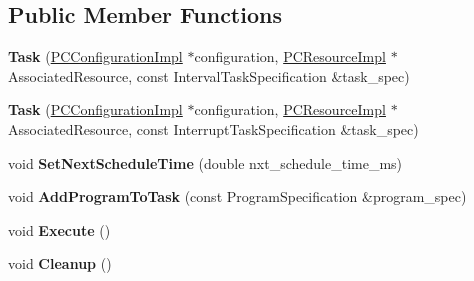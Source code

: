 \subsection*{Public Member Functions}
\begin{DoxyCompactItemize}
\item 
{\bfseries Task} (\hyperlink{classpc__emulator_1_1PCConfigurationImpl}{P\+C\+Configuration\+Impl} $\ast$configuration, \hyperlink{classpc__emulator_1_1PCResourceImpl}{P\+C\+Resource\+Impl} $\ast$Associated\+Resource, const Interval\+Task\+Specification \&task\+\_\+spec)\hypertarget{classpc__emulator_1_1Task_a2962f1944b608ea18c7ed1e57f73b664}{}\label{classpc__emulator_1_1Task_a2962f1944b608ea18c7ed1e57f73b664}

\item 
{\bfseries Task} (\hyperlink{classpc__emulator_1_1PCConfigurationImpl}{P\+C\+Configuration\+Impl} $\ast$configuration, \hyperlink{classpc__emulator_1_1PCResourceImpl}{P\+C\+Resource\+Impl} $\ast$Associated\+Resource, const Interrupt\+Task\+Specification \&task\+\_\+spec)\hypertarget{classpc__emulator_1_1Task_a9a55ba774c61ca5e8f1c648e7e9d857f}{}\label{classpc__emulator_1_1Task_a9a55ba774c61ca5e8f1c648e7e9d857f}

\item 
void {\bfseries Set\+Next\+Schedule\+Time} (double nxt\+\_\+schedule\+\_\+time\+\_\+ms)\hypertarget{classpc__emulator_1_1Task_aff1a23718b08cc7a28ab15e1de90221f}{}\label{classpc__emulator_1_1Task_aff1a23718b08cc7a28ab15e1de90221f}

\item 
void {\bfseries Add\+Program\+To\+Task} (const Program\+Specification \&program\+\_\+spec)\hypertarget{classpc__emulator_1_1Task_a733bec232faef021949c6905470f512f}{}\label{classpc__emulator_1_1Task_a733bec232faef021949c6905470f512f}

\item 
void {\bfseries Execute} ()\hypertarget{classpc__emulator_1_1Task_a95ceb2ef449c3ab5539c3353340d1847}{}\label{classpc__emulator_1_1Task_a95ceb2ef449c3ab5539c3353340d1847}

\item 
void {\bfseries Cleanup} ()\hypertarget{classpc__emulator_1_1Task_a384d41dbdfed5df46c895978f4af04cd}{}\label{classpc__emulator_1_1Task_a384d41dbdfed5df46c895978f4af04cd}

\end{DoxyCompactItemize}
